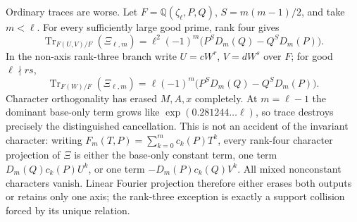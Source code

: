\documentclass[11pt,oneside]{article}
\theoremstyle{definition}
\theoremstyle{remark}
\newcommand{\Q}{\mathbb Q}
\begin{document}
Ordinary traces are worse.  Let
$F=\Q(\zeta_\ell,P,Q)$, $S=m(m-1)/2$, and take $m<\ell$.  For every sufficiently large good
prime, rank four gives
\begin{equation}
 \operatorname{Tr}_{F(U,V)/F}(\Xi_{\ell,m})
 =\ell^2(-1)^m\bigl(P^SD_m(Q)-Q^SD_m(P)\bigr).
 \label{crit:eq-newton-kummer-trace-four}
\end{equation}
In the non-axis rank-three branch write $U=cW^r$, $V=dW^s$ over $F$; for good
$\ell\nmid rs$,
\begin{equation}
 \operatorname{Tr}_{F(W)/F}(\Xi_{\ell,m})
 =\ell(-1)^m\bigl(P^SD_m(Q)-Q^SD_m(P)\bigr).
 \label{crit:eq-newton-kummer-trace-three}
\end{equation}
Character orthogonality has erased $M,A,x$ completely.  At $m=\ell-1$ the dominant base-only
term grows like $\exp(0.281244\ldots\ell)$, so trace destroys precisely the distinguished
cancellation.  This is not an accident of the invariant character: writing
$F_m(T,P)=\sum_{k=0}^mc_k(P)T^k$, every rank-four character projection of $\Xi$ is either
the base-only constant term, one term $D_m(Q)c_k(P)U^k$, or one term
$-D_m(P)c_k(Q)V^k$.  All mixed nonconstant characters vanish.  Linear Fourier projection
therefore either erases both outputs or retains only one axis; the rank-three exception is
exactly a support collision forced by its unique relation.
\end{document}
